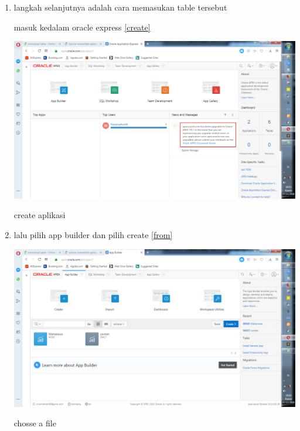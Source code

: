 \documentclass{article}
\begin{document}
\begin{enumerate}
     \item langkah selanjutnya adalah cara memasukan table tersebut
     
    masuk kedalam oracle express
      \ref{create}
    \begin{center}
         \centering
            \includegraphics[scale=0.27]{gambar/6.png}
        \caption{create aplikasi}
        \label{create}
    \end{center}
    
      \item lalu pilih app builder dan pilih create
      \ref{from}
    \begin{center}
         \centering
            \includegraphics[scale=0.27]{gambar/7.png}
        \caption{chosse a file}
        \label{from}
    \end{center}
    

\end{enumerate}
\end{document}
